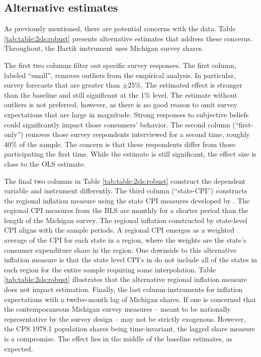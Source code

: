 \documentclass[12pt]{article}
\begin{document}
\subsection{Alternative estimates}

As previously mentioned, there are potential concerns with the data. Table \ref{tab:table:2sls:robust} presents alternative estimates that address these concerns. Throughout, the Bartik instrument uses Michigan survey shares.




The first two columns filter out specific survey responses. The first column, labeled ``small'', removes outliers from the empirical analysis. In particular, survey forecasts that are greater than $\pm 25\%$. The estimated effect is stronger than the baseline and still significant at the 1\% level. The estimate without outliers is not preferred, however, as there is no good reason to omit survey expectations that are large in magnitude. Strong responses to subjective beliefs could significantly impact those consumers' behavior. The second column (``first-only'') removes those survey respondents interviewed for a second time, roughly 40\% of the sample. The concern is that these respondents differ from those participating the first time. While the estimate is still significant, the effect size is close to the OLS estimate.

The final two columns in Table \ref{tab:table:2sls:robust} construct the dependent variable and instrument differently. The third column (``state-CPI'') constructs the regional inflation measure using the state CPI measures developed by \cite{NakamuraSteinsson:QJE2022}. The regional CPI measures from the BLS are monthly for a shorter period than the length of the Michigan survey. The regional inflation constructed by state-level CPI aligns with the sample periods. A regional CPI emerges as a weighted average of the CPI for each state in a region, where the weights are the state's consumer expenditure share in the region. One downside to this alternative inflation measure is that the state level CPI's in \cite{NakamuraSteinsson:QJE2022} do not include all of the states in each region for the entire sample requiring some interpolation. Table \ref{tab:table:2sls:robust} illustrates that the alternative regional inflation measure does not impact estimation. Finally, the last column instruments for inflation expectations with a twelve-month lag of Michigan shares. If one is concerned that the contemporaneous Michigan survey measures -- meant to be nationally representative by the survey design -- may not be strictly exogenous. However, the CPS 1978.1 population shares being time-invariant, the lagged share measure is a compromise. The effect lies in the middle of the baseline estimates, as expected.
\end{document}
